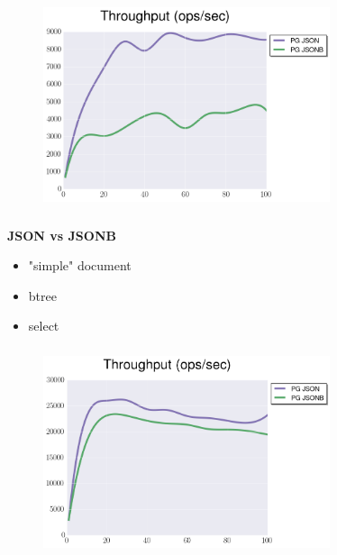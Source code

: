 \documentclass[usenames,dvipsnames, 18pt, compress, aspectratio=169]{beamer}
\begin{document}
\begin{frame}
    \frametitle{}
    \begin{center}
    \begin{figure}
        \includegraphics[width=0.75\textwidth,center]{benchmarks/postgresql_load_json_jsonb.png}
    \end{figure}
    \end{center}
\end{frame}

\begin{frame}
    \frametitle{}
    \begin{center}
        \textbf{JSON vs JSONB}
        \begin{itemize}[label={}]
            \item "simple" document
            \item btree
            \item select
        \end{itemize}
    \end{center}
\end{frame}

\begin{frame}
    \frametitle{}
    \begin{center}
    \begin{figure}
        \includegraphics[width=0.75\textwidth,center]{benchmarks/postgresql_select_json_jsonb.png}
    \end{figure}
    \end{center}
\end{frame}
\end{document}
